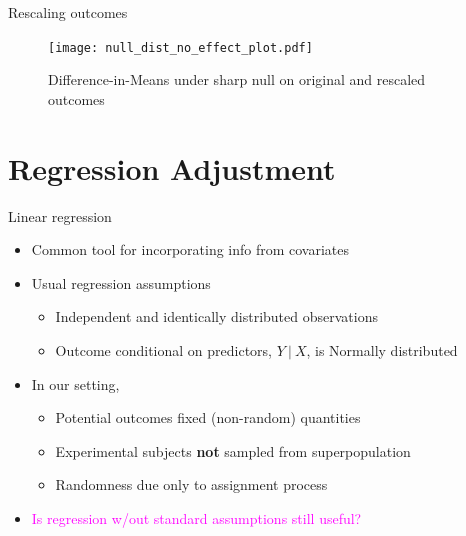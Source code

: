 \documentclass[table, xcolor = {dvipsnames}, 9pt]{beamer}
\newcommand\given[1][]{\:#1\vert\:}
\theoremstyle{plain}
\begin{document}
\begin{frame}{Rescaling outcomes} \vfill
\begin{figure}[H]
\texttt{[image: null\_dist\_no\_effect\_plot.pdf]}
\caption{Difference-in-Means under sharp null on original and rescaled outcomes}
\end{figure}
\end{frame}
\section{Regression Adjustment}
\begin{frame}{Linear regression} \vfill
\begin{itemize} \vfill
\item Common tool for incorporating info from covariates \vfill
\item Usual regression assumptions \vfill
\begin{itemize} \vfill
\item Independent and identically distributed observations \vfill
\item Outcome conditional on predictors, $Y \given X$, is Normally distributed \vfill
\end{itemize} \vfill
\item In our setting, \vfill
\begin{itemize}
\item Potential outcomes fixed (non-random) quantities \vfill
\item Experimental subjects \textbf{not} sampled from superpopulation \vfill
\item Randomness due only to assignment process \vfill
\end{itemize}  
\item \textcolor{magenta}{Is regression w/out standard assumptions still useful?}
\end{itemize} \vfill
\end{frame}
\end{document}
